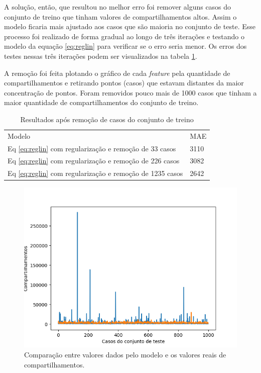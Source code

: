 \documentclass[10pt,twocolumn,letterpaper]{article}
\begin{document}
A solução, então, que resultou no melhor erro foi remover alguns casos do conjunto de treino que tinham valores de compartilhamentos altos. Assim o modelo ficaria mais ajustado aos casos que são maioria no conjunto de teste. Esse processo foi realizado de forma gradual ao longo de três iterações e testando o modelo da equação \ref{eq:reglin} para verificar se o erro seria menor. Os erros dos testes nessas três iterações podem ser visualizados na tabela \ref{tab:resultbom}.

A remoção foi feita plotando o gráfico de cada \textit{feature} pela quantidade de compartilhamentos e retirando pontos (casos) que estavam distantes da maior concentração de pontos. Foram removidos pouco mais de 1000 casos que tinham a maior quantidade de compartilhamentos do conjunto de treino.

\begin{table}[]
\centering
\caption{Resultados após remoção de casos do conjunto de treino}
\label{tab:resultbom}
\begin{tabular}{ll}
Modelo & MAE \\
Eq \ref{eq:reglin} com regularização e remoção de 33 casos & 3110 \\
Eq \ref{eq:reglin} com regularização e remoção de 226 casos & 3082 \\
Eq \ref{eq:reglin} com regularização e remoção de 1235 casos & 2642
\end{tabular}
\end{table}

\begin{figure}
\begin{center}
	\includegraphics[width=0.99\columnwidth]{pics/funcao.png}
	\caption{Comparação entre valores dados pelo modelo e os valores reais de compartilhamentos.}
	\label{fig:funcao}   
\end{center} 
\end{figure}
\end{document}
